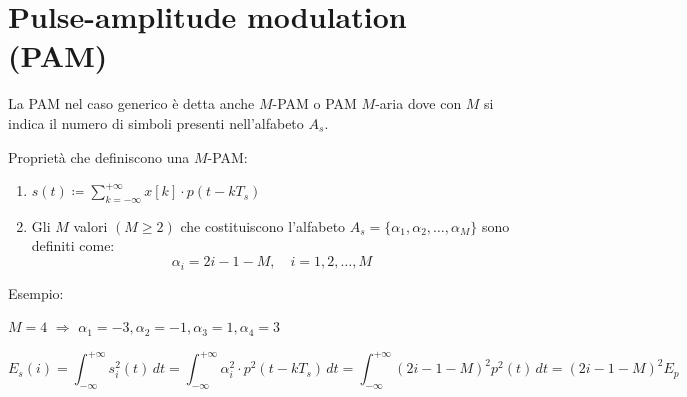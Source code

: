 \section*{Pulse-amplitude modulation (PAM)}

La PAM nel caso generico è detta anche \( M \)-PAM o PAM \( M \)-aria dove con \( M \) si indica il numero di simboli presenti nell'alfabeto \( A_s \).

\begin{center}
\end{center}

Proprietà che definiscono una \( M \)-PAM:

\begin{enumerate}
    \item \( s(t) \coloneqq \sum_{k=-\infty}^{+\infty} x[k]\cdot p(t - kT_s) \)
    \item Gli \( M \) valori \( (M \geq 2) \) che costituiscono l'alfabeto \( A_s = \{ \alpha_1, \alpha_2, \ldots, \alpha_M \} \) sono definiti come:
    \[ \alpha_i = 2i - 1 - M, \quad i = 1, 2, \ldots, M \]
\end{enumerate}

Esempio:

\( M=4 \) $\Rightarrow$ \( \alpha_1 = -3, \alpha_2 = -1, \alpha_3 = 1, \alpha_4 = 3 \)

\begin{center}
\end{center}
\[
E_s(i) = \int_{-\infty}^{+\infty} s_i^2(t) \, dt =  \int_{-\infty}^{+\infty} \alpha_i^2 \cdot p^2(t - kT_s) \, dt = \int_{-\infty}^{+\infty} (2i - 1 - M)^2 p^2(t) \, dt = (2i - 1 - M)^2 E_p
\]

